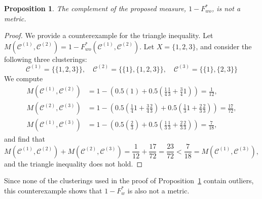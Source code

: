 \documentclass[review,los,12pt]{ryethesis}
\newtheorem{proposition}[theorem]{Proposition}
\newcommand\cCone{\mathcal{C}^{(1)}}
\newcommand\cCtwo{\mathcal{C}^{(2)}}
\newcommand\cCthree{\mathcal{C}^{(3)}}
\begin{document}
\begin{proposition} \label{prop:metric}
    The complement of the proposed measure, $1 - F^*_{wo}$, is not a metric.
\end{proposition}
\begin{proof}
    We provide a counterexample for the triangle inequality.
    Let $M(\cCone, \cCtwo) = 1 - F^*_{wo}(\cCone, \cCtwo)$.
    Let $X = \{1,2,3\}$, and consider the following three clusterings:
    \begin{equation*}
        \cCone = \{ \{1,2,3\} \}, \quad \cCtwo = \{ \{1\}, \{1,2,3\} \}, \quad \cCthree =  \{ \{1\}, \{2,3\} \}
    \end{equation*}
    We compute
    \begin{align*}
        M(\cCone, \cCtwo) &= 1 - \left( 0.5\left(1\right) + 0.5\left(\frac{1}{4}\frac{1}{3} + \frac{3}{4}1\right) \right) = \frac{1}{12},\\
        M(\cCtwo, \cCthree) &= 1 - \left( 0.5\left(\frac{1}{4}1 + \frac{3}{4}\frac{2}{3}\right) + 0.5\left(\frac{1}{3}1 + \frac{2}{3}\frac{2}{3}\right) \right) = \frac{17}{72},\\
        M(\cCone, \cCthree) &= 1 - \left( 0.5\left(\frac{2}{3}\right) + 0.5\left(\frac{1}{3}\frac{1}{3} + \frac{2}{3}\frac{2}{3}\right) \right) = \frac{7}{18},
    \end{align*}
    and find that
    \begin{equation*}
        M(\cCone, \cCtwo) + M(\cCtwo, \cCthree) = \frac{1}{12} + \frac{17}{72} = \frac{23}{72} < \frac{7}{18} = M(\cCone, \cCthree),
    \end{equation*}
    and the triangle inequality does not hold.
\end{proof}
Since none of the clusterings used in the proof of Proposition~\ref{prop:metric} contain outliers, this counterexample shows that $1-F^*_w$ is also not a metric.
\end{document}
